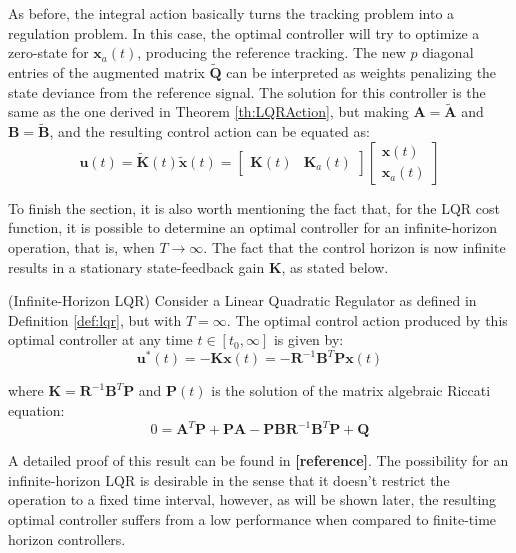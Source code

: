 \documentclass[a4paper,11pt]{book}
\numberwithin{figure}{chapter}
\numberwithin{equation}{chapter}
\numberwithin{table}{chapter}
\newtheorem{theorem}{Theorem}[chapter]
\theoremstyle{definition}
\newcounter{boxed-theorem}
\newenvironment{boxed-theorem}[1]
{\begin{shaded} \begin{theorem}{#1}}
{\end{theorem} \end{shaded}}
\newcounter{boxed-definition}
\begin{document}
As before, the integral action basically turns the tracking problem into a regulation problem. In this case, the optimal controller will try to optimize a zero-state for $\bm{x}_a(t)$, producing the reference tracking. The new $p$ diagonal entries of the augmented matrix $\tilde{\bm{Q}}$ can be interpreted as weights penalizing the state deviance from the reference signal. The solution for this controller is the same as the one derived in Theorem \ref{th:LQRAction}, but making $\bm{A} = \tilde{\bm{A}}$ and $\bm{B} = \tilde{\bm{B}}$, and the resulting control action can be equated as:
\begin{equation}
	\bm{u}(t) = \tilde{\bm{K}}(t)\tilde{\bm{x}}(t) = \begin{bmatrix} \bm{K}(t) & \bm{K}_a(t) \end{bmatrix} \begin{bmatrix} \bm{x}(t) \\ \bm{x}_a(t) \end{bmatrix}
\end{equation}

To finish the section, it is also worth mentioning the fact that, for the LQR cost function, it is possible to determine an optimal controller for an infinite-horizon operation, that is, when $T \to \infty$. The fact that the control horizon is now infinite results in a stationary state-feedback gain $\bm{K}$, as stated below.

\begin{boxed-theorem}{(Infinite-Horizon LQR)} \label{th:infiniteLQR}
	Consider a Linear Quadratic Regulator as defined in Definition \ref{def:lqr}, but with $T = \infty$. The optimal control action produced by this optimal controller at any time $t \in [t_0, \infty]$ is given by:
	\begin{equation}
		\bm{u}^*(t) = - \bm{K} \bm{x}(t) = - \bm{R}^{-1} \bm{B}^T \bm{P} \bm{x}(t)
	\end{equation}
	
	\noindent where $\bm{K} = \bm{R}^{-1} \bm{B}^T \bm{P}$ and $\bm{P}(t)$ is the solution of the matrix algebraic Riccati equation:
	\begin{equation}
		0 = \bm{A}^T \bm{P} + \bm{P} \bm{A} - \bm{P} \bm{B} \bm{R}^{-1} \bm{B}^T \bm{P} + \bm{Q}
	\end{equation}
\end{boxed-theorem}

A detailed proof of this result can be found in \textbf{[reference]}. The possibility for an infinite-horizon LQR is desirable in the sense that it doesn't restrict the operation to a fixed time interval, however, as will be shown later, the resulting optimal controller suffers from a low performance when compared to finite-time horizon controllers.
\end{document}
